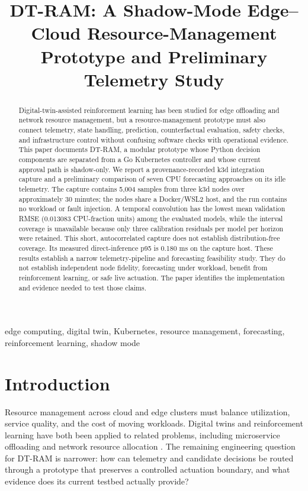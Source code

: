 \documentclass[conference]{IEEEtran}
\title{DT-RAM: A Shadow-Mode Edge--Cloud Resource-Management Prototype and Preliminary Telemetry Study}
\author{\IEEEauthorblockN{DT-RAM Project Team}}
\begin{document}
\maketitle

\begin{abstract}
Digital-twin-assisted reinforcement learning has been studied for edge offloading and network resource management, but a resource-management prototype must also connect telemetry, state handling, prediction, counterfactual evaluation, safety checks, and infrastructure control without confusing software checks with operational evidence. This paper documents DT-RAM, a modular prototype whose Python decision components are separated from a Go Kubernetes controller and whose current approval path is shadow-only. We report a provenance-recorded k3d integration capture and a preliminary comparison of seven CPU forecasting approaches on its idle telemetry. The capture contains 5,004 samples from three k3d nodes over approximately 30 minutes; the nodes share a Docker/WSL2 host, and the run contains no workload or fault injection. A temporal convolution has the lowest mean validation RMSE (0.013083 CPU-fraction units) among the evaluated models, while the interval coverage is unavailable because only three calibration residuals per model per horizon were retained. This short, autocorrelated capture does not establish distribution-free coverage. Its measured direct-inference p95 is 0.180 ms on the capture host. These results establish a narrow telemetry-pipeline and forecasting feasibility study. They do not establish independent node fidelity, forecasting under workload, benefit from reinforcement learning, or safe live actuation. The paper identifies the implementation and evidence needed to test those claims.
\end{abstract}

\begin{IEEEkeywords}
edge computing, digital twin, Kubernetes, resource management, forecasting, reinforcement learning, shadow mode
\end{IEEEkeywords}

\section{Introduction}
Resource management across cloud and edge clusters must balance utilization, service quality, and the cost of moving workloads. Digital twins and reinforcement learning have both been applied to related problems, including microservice offloading and network resource allocation \cite{chen2023,cheng2025}. The remaining engineering question for DT-RAM is narrower: how can telemetry and candidate decisions be routed through a prototype that preserves a controlled actuation boundary, and what evidence does its current testbed actually provide?
\end{document}
